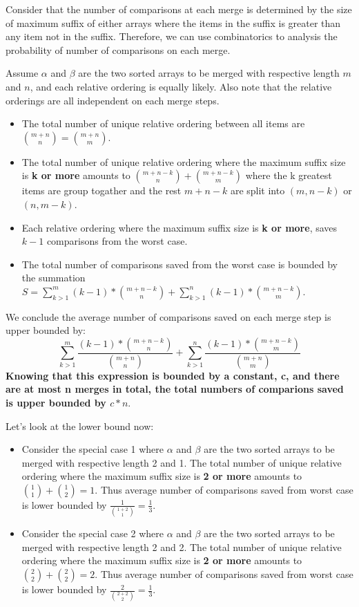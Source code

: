 \documentclass[12pt]{article}
\begin{document}
\begin{enumerate}
\begin{itemize}
Consider that the number of comparisons at each merge is determined by the size of maximum suffix of either arrays where the items in the suffix is greater than any item not in the suffix. Therefore, we can use combinatorics to analysis the probability of number of comparisons on each merge.

Assume $\alpha$ and $\beta$ are the two sorted arrays to be merged with respective length $m$ and $n$, and each relative ordering is equally likely. Also note that the relative orderings are all independent on each merge steps.

\begin{itemize}
\item{} The total number of unique relative ordering between all items are ${m + n \choose n} = {m + n \choose m}$.
\item{} The total number of unique relative ordering where the maximum suffix size is \textbf{k or more} amounts to ${m + n - k \choose n} + {m + n - k \choose m}$ where the k greatest items are group togather and the rest $m + n - k$ are split into $(m, n - k)$ or $(n, m - k)$.
\item{} Each relative ordering where the maximum suffix size is \textbf{k or more}, saves $k - 1$ comparisons from the worst case.
\item{} The total number of comparisons saved from the worst case is bounded by the summation $S = \sum^{m}_{k > 1}{(k - 1)*{m + n - k \choose n}} + \sum^{n}_{k > 1}{(k - 1)*{m + n - k \choose m}}$.
\end{itemize}

We conclude the average number of comparisons saved on each merge step is upper bounded by:
\begin{equation}
\sum^{m}_{k > 1}{\frac{(k - 1)*{m + n - k \choose n}}{{m + n \choose n}}} + \sum^{n}_{k > 1}{\frac{(k - 1)*{m + n - k \choose m}}{{m + n \choose m}}}
\end{equation}
\textbf{Knowing that this expression is bounded by a constant, c, and there are at most n merges in total,  the total numbers of comparions saved is upper bounded by $c * n$}.

Let's look at the lower bound now:
\begin{itemize}
\item{} Consider the special case 1 where $\alpha$ and $\beta$ are the two sorted arrays to be merged with respective length 2 and 1. The total number of unique relative ordering where the maximum suffix size is \textbf{2 or more} amounts to ${1 \choose 1} + {1 \choose 2} = 1$. Thus average number of comparisons saved from worst case is lower bounded by $\frac{1}{{1 + 2 \choose 1}} = \frac{1}{3}$.
\item{} Consider the special case 2 where $\alpha$ and $\beta$ are the two sorted arrays to be merged with respective length 2 and 2. The total number of unique relative ordering where the maximum suffix size is \textbf{2 or more} amounts to ${2 \choose 2} + {2 \choose 2} = 2$. Thus average number of comparisons saved from worst case is lower bounded by $\frac{2}{{2 + 2 \choose 2}} = \frac{1}{3}$.
\end{itemize}


\end{itemize}
\end{enumerate}
\end{document}
